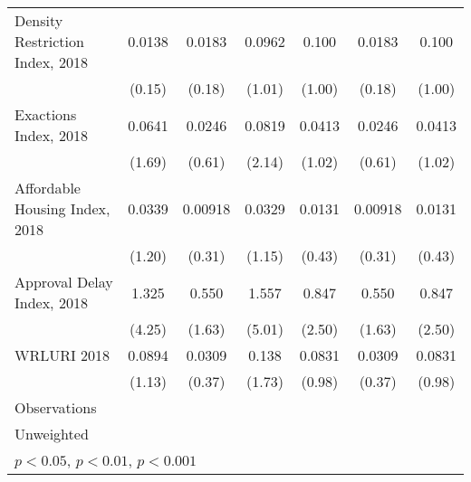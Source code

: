 \begin{table}[htbp]
\begin{tabular}{l*{6}{c}}
Density Restriction Index, 2018&      0.0138         &      0.0183         &      0.0962         &       0.100         &      0.0183         &       0.100         \\
                    &      (0.15)         &      (0.18)         &      (1.01)         &      (1.00)         &      (0.18)         &      (1.00)         \\
\addlinespace
Exactions Index, 2018&      0.0641         &      0.0246         &      0.0819\sym{*}  &      0.0413         &      0.0246         &      0.0413         \\
                    &      (1.69)         &      (0.61)         &      (2.14)         &      (1.02)         &      (0.61)         &      (1.02)         \\
\addlinespace
Affordable Housing Index, 2018&      0.0339         &     0.00918         &      0.0329         &      0.0131         &     0.00918         &      0.0131         \\
                    &      (1.20)         &      (0.31)         &      (1.15)         &      (0.43)         &      (0.31)         &      (0.43)         \\
\addlinespace
Approval Delay Index, 2018&       1.325\sym{***}&       0.550         &       1.557\sym{***}&       0.847\sym{*}  &       0.550         &       0.847\sym{*}  \\
                    &      (4.25)         &      (1.63)         &      (5.01)         &      (2.50)         &      (1.63)         &      (2.50)         \\
\addlinespace
WRLURI 2018         &      0.0894         &      0.0309         &       0.138         &      0.0831         &      0.0309         &      0.0831         \\
                    &      (1.13)         &      (0.37)         &      (1.73)         &      (0.98)         &      (0.37)         &      (0.98)         \\
\midrule
Observations        &                     &                     &                     &                     &                     &                     \\
\bottomrule
\multicolumn{7}{l}{\footnotesize Unweighted}\\
\multicolumn{7}{l}{\footnotesize \sym{*} \(p<0.05\), \sym{**} \(p<0.01\), \sym{***} \(p<0.001\)}\\
\end{tabular}
\end{table}
